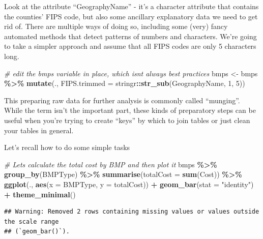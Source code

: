 \documentclass[
]{article}
\newenvironment{Shaded}{\begin{snugshade}}{\end{snugshade}}
\newcommand{\AttributeTok}[1]{\textcolor[rgb]{0.13,0.29,0.53}{#1}}
\newcommand{\CommentTok}[1]{\textcolor[rgb]{0.56,0.35,0.01}{\textit{#1}}}
\newcommand{\DecValTok}[1]{\textcolor[rgb]{0.00,0.00,0.81}{#1}}
\newcommand{\FunctionTok}[1]{\textcolor[rgb]{0.13,0.29,0.53}{\textbf{#1}}}
\newcommand{\NormalTok}[1]{#1}
\newcommand{\OtherTok}[1]{\textcolor[rgb]{0.56,0.35,0.01}{#1}}
\newcommand{\SpecialCharTok}[1]{\textcolor[rgb]{0.81,0.36,0.00}{\textbf{#1}}}
\newcommand{\StringTok}[1]{\textcolor[rgb]{0.31,0.60,0.02}{#1}}
\begin{document}
Look at the attribute ``GeographyName'' - it's a character attribute
that contains the counties' FIPS code, but also some ancillary
explanatory data we need to get rid of. There are multiple ways of doing
so, including some (very) fancy automated methods that detect patterns
of numbers and characters. We're going to take a simpler approach and
assume that all FIPS codes are only 5 characters long.

\begin{Shaded}
\begin{Highlighting}[]
\CommentTok{\# edit the bmps variable in place, which isn\textquotesingle{}t always best practices}
\NormalTok{bmps }\OtherTok{\textless{}{-}}\NormalTok{ bmps }\SpecialCharTok{\%\textgreater{}\%} \FunctionTok{mutate}\NormalTok{(., }\AttributeTok{FIPS.trimmed =}\NormalTok{ stringr}\SpecialCharTok{::}\FunctionTok{str\_sub}\NormalTok{(GeographyName, }\DecValTok{1}\NormalTok{, }\DecValTok{5}\NormalTok{))}
\end{Highlighting}
\end{Shaded}

This preparing raw data for further analysis is commonly called
``munging''. While the term isn't the important part, these kinds of
preparatory steps can be useful when you're trying to create ``keys'' by
which to join tables or just clean your tables in general.

Let's recall how to do some simple tasks

\begin{Shaded}
\begin{Highlighting}[]
\CommentTok{\# Let\textquotesingle{}s calculate the total cost by BMP and then plot it}
\NormalTok{bmps }\SpecialCharTok{\%\textgreater{}\%} \FunctionTok{group\_by}\NormalTok{(BMPType) }\SpecialCharTok{\%\textgreater{}\%} \FunctionTok{summarise}\NormalTok{(}\AttributeTok{totalCost =} \FunctionTok{sum}\NormalTok{(Cost)) }\SpecialCharTok{\%\textgreater{}\%}
  \FunctionTok{ggplot}\NormalTok{(., }\FunctionTok{aes}\NormalTok{(}\AttributeTok{x =}\NormalTok{ BMPType, }\AttributeTok{y =}\NormalTok{ totalCost)) }\SpecialCharTok{+}
  \FunctionTok{geom\_bar}\NormalTok{(}\AttributeTok{stat =} \StringTok{"identity"}\NormalTok{) }\SpecialCharTok{+}
  \FunctionTok{theme\_minimal}\NormalTok{()}
\end{Highlighting}
\end{Shaded}

\begin{verbatim}
## Warning: Removed 2 rows containing missing values or values outside the scale range
## (`geom_bar()`).
\end{verbatim}
\end{document}
